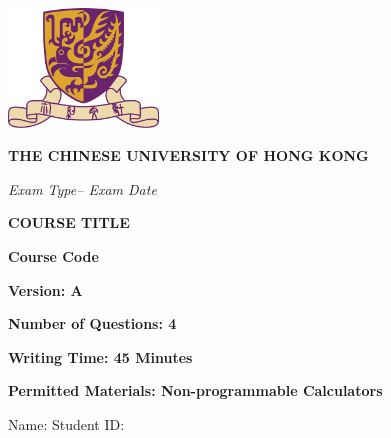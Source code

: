 \documentclass[a4paper,12pt,fleqn]{article}
\newcommand{\institution}{THE CHINESE UNIVERSITY OF HONG KONG}
\newcommand{\titlehd}{COURSE TITLE}
\newcommand{\examtype}{Exam Type}
\newcommand{\examdate}{Exam Date}
\newcommand{\examcode}{Course Code}
\newcommand{\version}{A}
\newcommand{\writetime}{45 Minutes}
\newcommand{\questionnumber}{4}
\newcommand{\materials}{Non-programmable Calculators}
\begin{document}

\begin{center}
    \includegraphics[width=4cm]{Emblem_of_CU.png}
\end{center}

\vspace{0.5cm}

\begin{center}
\Large\textbf{\institution}
\end{center}

\begin{center}
\textit{ \examtype -- \examdate}
\end{center}
\vspace{0.25cm}

\begin{center}
\large\textbf{\titlehd}
\end{center}

\begin{center}
\textbf{\examcode}
\end{center}



\begin{center}
\large\textbf{Version: \version}
\end{center}
\vspace{0.25cm}
\begin{center}
\textbf{Number of Questions: \questionnumber}
\end{center}
\begin{center}
\textbf{Writing Time:  \writetime}
\end{center}
\begin{center}
\textbf{Permitted Materials: \materials}
\end{center}
\vspace{0.5cm}

\noindent Name: \underline{\hspace{5cm}} \hspace{2cm} Student ID: \underline{\hspace{5cm}} \hspace{0.5cm} 
\vspace{0.5cm}
\end{document}

